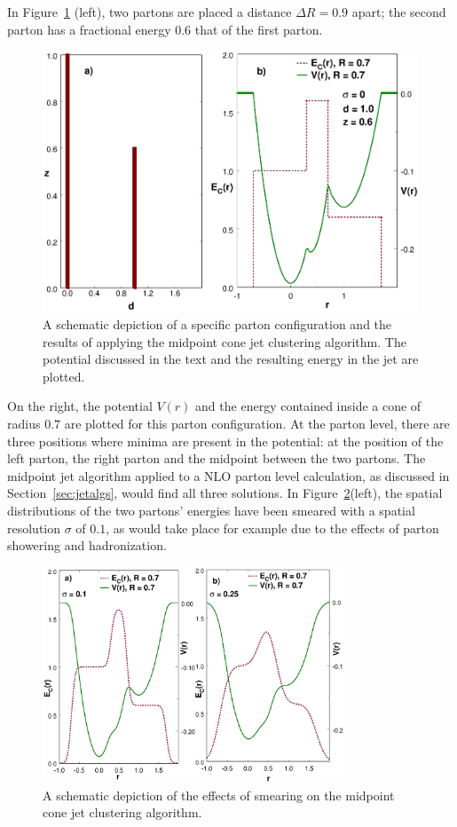 \documentclass[12pt]{iopart}
\begin{document}
In Figure~\ref{fig:Edist} (left), two partons are placed a distance $\Delta R=0.9$ apart; the second parton has a 
fractional energy $0.6$ that of the first parton. 
%
\begin{figure}[t]
\begin{center}
\includegraphics[width=12cm]{Edist.eps}
\end{center}
\vspace*{-0.5cm}
\caption{A schematic depiction of a specific parton configuration and the results of applying the midpoint cone
jet clustering algorithm. The potential discussed in the text and the resulting energy in the jet are plotted. 
\label{fig:Edist}}
\end{figure}
%
On the right, the potential $V(r)$ and the energy contained inside a cone of radius $0.7$ are plotted  for this parton
configuration. At  the parton level, there are three positions where minima are present in the potential: at the position of the left
parton, the right parton and the midpoint between the two partons. The midpoint jet algorithm applied to a NLO parton level
calculation, as discussed in Section~\ref{sec:jetalgs}, would find all three solutions.  In Figure~\ref{fig:smearPT6}(left), the spatial distributions
of the two partons' energies have been smeared with a spatial resolution  $\sigma$ of $0.1$, as would take place for example due to the effects
of parton showering and  hadronization.
%
\begin{figure}[t]
\begin{center}
\includegraphics[width=9cm]{smearPT6.eps}
\end{center}
\vspace*{-0.5cm}
\caption{A schematic depiction of the effects of smearing on the midpoint cone jet clustering algorithm. 
\label{fig:smearPT6}}
\end{figure}
\end{document}
